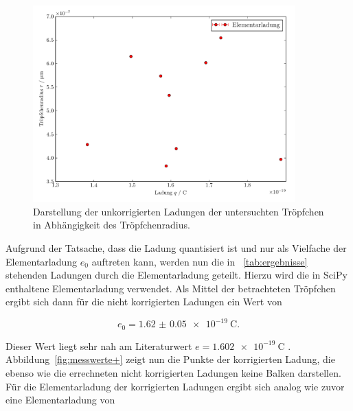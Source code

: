 \documentclass[
  bibliography=totoc,     %
  captions=tableheading,  %
  titlepage=firstiscover, %
]{scrartcl}
\begin{document}
\begin{figure}[h]
    \centering
    \includegraphics[width=0.9\textwidth]{plot_messwerte.pdf}
    \caption{Darstellung der unkorrigierten Ladungen der untersuchten Tröpfchen in Abhängigkeit des Tröpfchenradius.}
    \label{fig:messwerte}
\end{figure}

Aufgrund der Tatsache, dass die Ladung quantisiert ist und nur als Vielfache der Elementarladung $e_0$ auftreten kann, werden nun die in ~\ref{tab:ergebnisse} stehenden Ladungen durch die Elementarladung geteilt. Hierzu wird die in SciPy enthaltene Elementarladung verwendet. Als Mittel der betrachteten Tröpfchen ergibt sich dann für die nicht korrigierten Ladungen ein Wert von

\begin{equation}
    e_0 = \SI{1.62(5)e-19}{\coulomb}.
\end{equation}

Dieser Wert liegt sehr nah am Literaturwert $e = \SI{1.602e-19}{\coulomb}$ \cite{Elementarladung}. Abbildung~\ref{fig:messwerte+} zeigt nun die Punkte der korrigierten Ladung, die ebenso wie die errechneten nicht korrigierten Ladungen keine Balken darstellen. Für die Elementarladung der korrigierten Ladungen ergibt sich analog wie zuvor eine Elementarladung von
\end{document}
